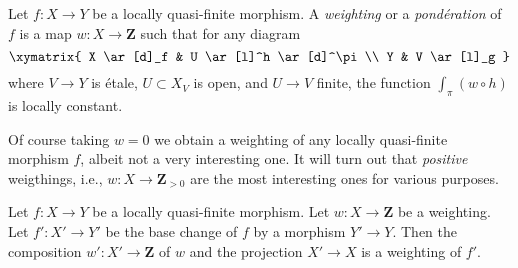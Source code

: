 \begin{definition}
\label{definition-weighting}
Let $f : X \to Y$ be a locally quasi-finite morphism. A
{\it weighting} or a {\it pond\'eration} of $f$ is a map
$w : X \to \mathbf{Z}$ such that for any diagram
$$
\xymatrix{
X \ar[d]_f & U \ar[l]^h \ar[d]^\pi \\
Y & V \ar[l]_g
}
$$
where $V \to Y$ is \'etale, $U \subset X_V$ is open, and $U \to V$ finite,
the function $\int_\pi (w \circ h)$ is locally constant.
\end{definition}

\noindent
Of course taking $w = 0$ we obtain a weighting of any locally quasi-finite
morphism $f$, albeit not a very interesting one. It will turn out that
{\it positive} weigthings, i.e., $w : X \to \mathbf{Z}_{> 0}$ are the
most interesting ones for various purposes.

\begin{lemma}
\label{lemma-weighting-base-change}
Let $f : X \to Y$ be a locally quasi-finite morphism.
Let $w : X \to \mathbf{Z}$ be a weighting. Let $f' : X' \to Y'$
be the base change of $f$ by a morphism $Y' \to Y$. Then the
composition $w' : X' \to \mathbf{Z}$ of $w$ and the projection $X' \to X$
is a weighting of $f'$.
\end{lemma}


